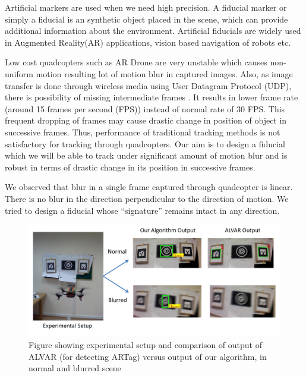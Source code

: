 \documentclass[runningheads]{llncs}
\begin{document}
Artificial markers are used when we need high precision. A fiducial marker or
simply a fiducial is an synthetic object placed in the scene, which can provide
additional information about the environment. Artificial fiducials are widely
used in Augmented Reality(AR) \cite{Zhang:2002}\cite{Dorfmuller99}
applications, vision based navigation of robots\cite{Davison:2007} etc.

Low cost quadcopters such as AR Drone are very unstable which
causes non-uniform motion resulting lot of motion blur in captured images.
Also, as image transfer is done through wireless media using User Datagram
Protocol (UDP), there is possibility of missing intermediate frames . It
results in lower frame rate (around 15 frames per second (FPS)) instead of
normal rate of 30 FPS. This frequent dropping of frames may cause drastic
change in position of object in successive frames. Thus, performance of
traditional tracking methods is not satisfactory for tracking through
quadcopters. Our aim is to design a fiducial which we will be able to track
under significant amount of motion blur and is robust in terms of drastic
change in its position in successive frames.

We observed that blur in a single frame captured through quadcopter is linear.
There is no blur in the direction perpendicular to the direction of motion. We
tried to design a fiducial whose ``signature'' remains intact in any direction.

\begin{figure}
\includegraphics[width=\linewidth]{teaser.pdf}
\caption{Figure showing experimental setup and comparison of
output of ALVAR\cite{alvar} (for detecting ARTag) versus output of our
algorithm, in normal and blurred scene}
\end{figure}
\end{document}
